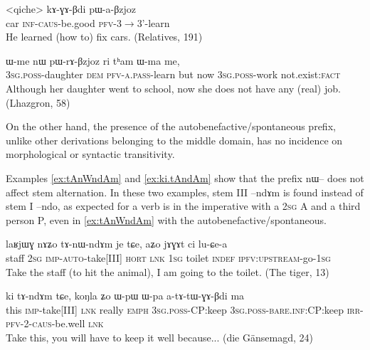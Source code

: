 \documentclass[oldfontcommands,oneside,a4paper,11pt]{article}
\newcommand{\ipa}[1]{{\phon \mbox{#1}}} %
\begin{document}
 \begin{exe}
\ex \label{ex:paBzjoz}
\gll 
<qiche> 	\ipa{kɤ-ɣɤ-βdi} 	\ipa{pɯ-a-βzjoz} \\
car \textsc{inf-caus}-be.good \textsc{pfv}-3$\rightarrow$3'-learn \\
\glt He learned (how to) fix cars. (Relatives, 191)
\end{exe}

 \begin{exe}
\ex \label{ex:pWrABzjoz}
\gll 
\ipa{ɯ-me} 	\ipa{nɯ} 	\ipa{pɯ-rɤ-βzjoz} 	\ipa{ri} 	\ipa{tʰam} 	\ipa{ɯ-ma} 	\ipa{me,} \\
\textsc{3sg.poss}-daughter \textsc{dem} \textsc{pfv-a.pass}-learn but now \textsc{3sg.poss}-work not.exist:\textsc{fact} \\
\glt Although her daughter went to school, now she does not have any (real) job. (Lhazgron, 58)
\end{exe}

On the other hand, the presence of the autobenefactive/spontaneous prefix, unlike other derivations belonging to the middle domain, has no incidence on  morphological or syntactic transitivity. 
 
 Examples \ref{ex:tAnWndAm} and \ref{ex:ki.tAndAm} show that the prefix \ipa{nɯ--} does not affect stem alternation. In these two examples, stem III   \ipa{--ndɤm} is found instead of stem I \ipa{--ndo}, as expected for a verb is in the imperative with a \textsc{2sg} A and a third person P, even in \ref{ex:tAnWndAm} with the autobenefactive/spontaneous.
 

 \begin{exe}
\ex \label{ex:tAnWndAm}
\gll
\ipa{laʁjɯɣ} 	\ipa{nɤʑo} 	\ipa{tɤ-nɯ-ndɤm} 	\ipa{je} 	\ipa{tɕe,} 	\ipa{aʑo} 	\ipa{jɤɣɤt} 	\ipa{ci} 	\ipa{lu-ɕe-a} 	\\
staff \textsc{2sg} \textsc{imp-auto}-take[III] \textsc{hort} \textsc{lnk} \textsc{1sg} toilet \textsc{indef} \textsc{ipfv:upstream}-go-\textsc{1sg} \\
\glt Take the staff (to hit the animal), I am going to the toilet. (The tiger, 13) 
\end{exe}

 \begin{exe}
\ex \label{ex:ki.tAndAm}
\gll
\ipa{ki}  	\ipa{tɤ-ndɤm}  	\ipa{tɕe,}  	\ipa{koŋla}  	\ipa{ʑo}   \ipa{ɯ-pɯ}  	\ipa{ɯ-pa}  	\ipa{a-tɤ-tɯ-ɣɤ-βdi}  	\ipa{ma}  \\
this \textsc{imp}-take[III] \textsc{lnk} really \textsc{emph} \textsc{3sg.poss}-CP:keep \textsc{3sg.poss}-\textsc{bare.inf}:CP:keep \textsc{irr-pfv-2-caus}-be.well \textsc{lnk} \\
\glt Take this, you will have to keep it well because... (die Gänsemagd, 24)
\end{exe}
\end{document}
